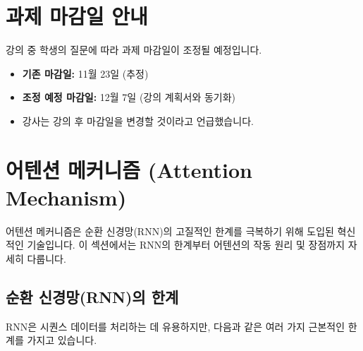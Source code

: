 \documentclass[11pt,a4paper]{article}
\begin{document}
\newpage
\section{과제 마감일 안내}
강의 중 학생의 질문에 따라 과제 마감일이 조정될 예정입니다.

\begin{summarybox}[title={과제 10 마감일 조정}]
\begin{itemize}
    \item \textbf{기존 마감일:} 11월 23일 (추정)
    \item \textbf{조정 예정 마감일:} 12월 7일 (강의 계획서와 동기화)
    \item 강사는 강의 후 마감일을 변경할 것이라고 언급했습니다.
\end{itemize}
\end{summarybox}

\newpage
\section{어텐션 메커니즘 (Attention Mechanism)}
어텐션 메커니즘은 순환 신경망(RNN)의 고질적인 한계를 극복하기 위해 도입된 혁신적인 기술입니다. 이 섹션에서는 RNN의 한계부터 어텐션의 작동 원리 및 장점까지 자세히 다룹니다.

\subsection{순환 신경망(RNN)의 한계}
RNN은 시퀀스 데이터를 처리하는 데 유용하지만, 다음과 같은 여러 가지 근본적인 한계를 가지고 있습니다.
\end{document}
